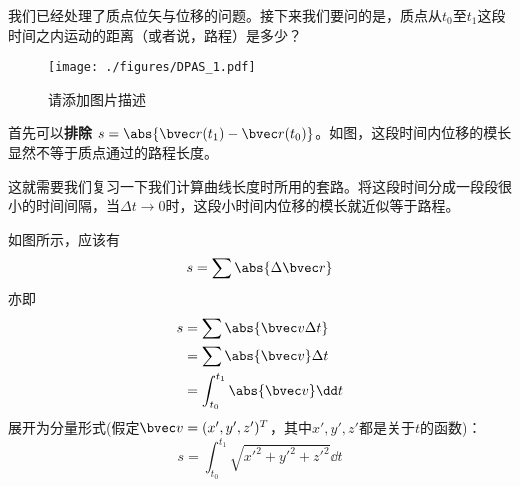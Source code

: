 
我们已经处理了质点位矢与位移的问题。接下来我们要问的是，质点从$t_0$至$t_1$这段时间之内运动的距离（或者说，路程）是多少？
\begin{figure}[ht]
\centering
\texttt{[image: ./figures/DPAS\_1.pdf]}
\caption{请添加图片描述} \label{DPAS_fig1}
\end{figure}
首先可以\textbf{排除} $s = \abs{\bvec r(t_1) - \bvec r(t_0)}  $。如图，这段时间内位移的模长显然不等于质点通过的路程长度。

这就需要我们复习一下我们计算曲线长度时所用的套路。将这段时间分成一段段很小的时间间隔，当$\Delta t \to 0$时，这段小时间内位移的模长就近似等于路程。

如图所示，应该有$$s=\sum \abs{\Delta \bvec r}$$
亦即$$
\begin{aligned}
s&=\sum \abs{\bvec v \Delta t}\\
&=\sum \abs{\bvec v} \Delta t\\
&=\int _{t_0}^{t_1} \abs{\bvec v} \dd t\\
\end{aligned}
$$
展开为分量形式(假定$\bvec v = (x',y',z')^T$，其中$x',y',z'$都是关于$t$的函数)：
$$
s = \int _{t_0}^{t_1} \sqrt{x'^2+y'^2+z'^2} \dd t
$$
